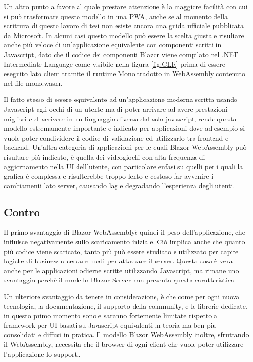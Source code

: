 Un altro punto a favore al quale prestare attenzione \`e la maggiore facilit\`a con cui si pu\`o trasformare questo modello in una PWA, anche se al momento della scrittura di questo lavoro di tesi non esiste ancora una guida ufficiale pubblicata da Microsoft.
In alcuni casi questo modello pu\`o essere la scelta giusta e risultare anche pi\`u veloce di un'applicazione equivalente con componenti scritti in Javascript, dato che il codice dei componenti Blazor viene compilato nel .NET Intermediate Language come visibile nella figura \ref{fig:CLR}  prima di essere eseguito lato client tramite il runtime Mono tradotto in WebAssembly contenuto nel file mono.wasm.

Il fatto stesso di essere equivalente ad un'applicazione moderna scritta usando Javascript agli occhi di un utente ma di poter arrivare ad avere prestazioni migliori e di scrivere in un linguaggio diverso dal solo javascript, rende questo modello estremamente importante e indicato per applicazioni dove ad esempio si vuole poter condividere il codice di validazione ed utilizzarlo tra frontend e backend.
Un'altra categoria di applicazioni per le quali Blazor WebAssembly pu\`o risultare pi\`u indicato, \`e quella dei videogiochi con alta frequenza di aggiornamento nella UI dell'utente, con particolare enfasi su quelli per i quali la grafica \`e complessa e risulterebbe troppo lento e costoso far avvenire i cambiamenti lato server, causando lag e degradando l'esperienza degli utenti.
 
\subsection{Contro}\label{sez:controBWA}
Il primo svantaggio di Blazor WebAssembly\`e quindi il peso dell'applicazione, che influisce negativamente sullo scaricamento iniziale.
Ci\`o implica anche che quanto pi\`u codice viene scaricato, tanto pi\`u pu\`o essere studiato e utilizzato per capire logiche di business o cercare modi per attaccare il server.
Questa cosa \`e vera anche per le applicazioni odierne scritte utilizzando Javascript, ma rimane uno svantaggio perch\`e il modello Blazor Server non presenta questa caratteristica.

Un ulteriore svantaggio da tenere in considerazione, \`e che come per ogni nuova tecnologia, la documentazione, il supporto della community, e le librerie dedicate, in questo primo momento sono e saranno fortemente limitate rispetto a framework per UI basati su Javascript equivalenti in teoria ma ben pi\`u consolidati e diffusi in pratica.
Il modello Blazor WebAssembly inoltre, sfruttando il WebAssembly, necessita che il browser di ogni client che vuole poter utilizzare l'applicazione lo supporti.

